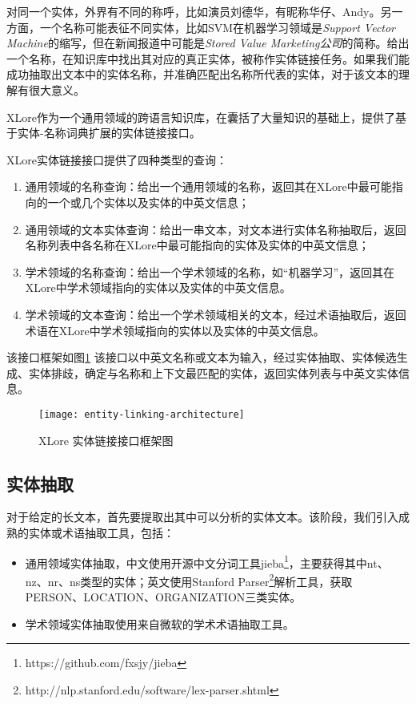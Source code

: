 对同一个实体，外界有不同的称呼，比如演员刘德华，有昵称华仔、Andy。另一方面，一个名称可能表征不同实体，比如SVM在机器学习领域是\textit{Support Vector Machine}的缩写，但在新闻报道中可能是\textit{Stored Value Marketing公司}的简称。给出一个名称，在知识库中找出其对应的真正实体，被称作{\heiti 实体链接}任务。如果我们能成功抽取出文本中的实体名称，并准确匹配出名称所代表的实体，对于该文本的理解有很大意义。

XLore作为一个通用领域的跨语言知识库，在囊括了大量知识的基础上，提供了基于实体-名称词典扩展的实体链接接口。

XLore实体链接接口提供了四种类型的查询：
\begin{enumerate}[1.]
\item 通用领域的名称查询：给出一个通用领域的名称，返回其在XLore中最可能指向的一个或几个实体以及实体的中英文信息；
\item 通用领域的文本实体查询：给出一串文本，对文本进行实体名称抽取后，返回名称列表中各名称在XLore中最可能指向的实体及实体的中英文信息；
\item 学术领域的名称查询：给出一个学术领域的名称，如“机器学习”，返回其在XLore中学术领域指向的实体以及实体的中英文信息。
\item 学术领域的文本查询：给出一个学术领域相关的文本，经过术语抽取后，返回术语在XLore中学术领域指向的实体以及实体的中英文信息。
\end{enumerate}

该接口框架如图\ref{fig:entity-linking-architecture}
该接口以中英文名称或文本为输入，经过实体抽取、实体候选生成、实体排歧，确定与名称和上下文最匹配的实体，返回实体列表与中英文实体信息。
\begin{figure}[H]
  \centering
  \texttt{[image: entity-linking-architecture]}
  \caption{XLore 实体链接接口框架图}
  \label{fig:entity-linking-architecture}
\end{figure}

\subsection{实体抽取}
对于给定的长文本，首先要提取出其中可以分析的实体文本。该阶段，我们引入成熟的实体或术语抽取工具，包括：
\begin{itemize}
\item 通用领域实体抽取，中文使用开源中文分词工具jieba\footnote{https://github.com/fxsjy/jieba}，主要获得其中nt、nz、nr、ns类型的实体；英文使用Stanford Parser\footnote{http://nlp.stanford.edu/software/lex-parser.shtml}解析工具，获取PERSON、LOCATION、ORGANIZATION三类实体。
\item 学术领域实体抽取使用来自微软的学术术语抽取工具。
\end{itemize}

